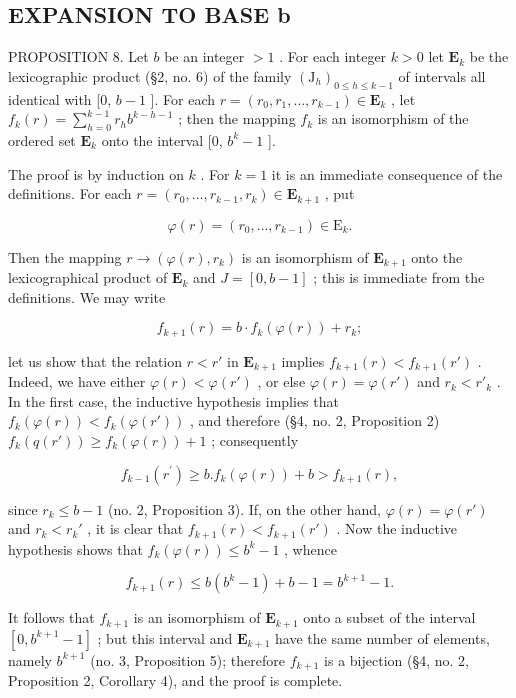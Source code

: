 \subsection{EXPANSION TO BASE b}

PROPOSITION 8. Let \(b\) be an integer \(> 1\) . For each integer \(k > 0\) let \(\mathbf{E}_k\) be the lexicographic product (§2, no. 6) of the family \((\mathrm{J}_h)_{0 \leqslant h \leqslant k-1}\) of intervals all identical with {[}0, \(b - 1\) {]}. For each \(r = (r_0, r_1, \ldots, r_{k-1}) \in \mathbf{E}_k\) , let \(f_k(r) = \sum_{h=0}^{k-1} r_h b^{k-h-1}\) ; then the mapping \(f_k\) is an isomorphism of the ordered set \(\mathbf{E}_k\) onto the interval {[}0, \(b^k - 1\) {]}.

The proof is by induction on \(k\) . For \(k = 1\) it is an immediate consequence of the definitions. For each \(r = (r_0, \ldots, r_{k-1}, r_k) \in \mathbf{E}_{k+1}\) , put

\[
\varphi (r) = \left(r _ {0}, \dots , r _ {k - 1}\right) \in \mathrm{E} _ {k}.
\]

Then the mapping \(r \to (\varphi(r), r_k)\) is an isomorphism of \(\mathbf{E}_{k+1}\) onto the lexicographical product of \(\mathbf{E}_k\) and \(J = [0, b - 1]\) ; this is immediate from the definitions. We may write

\[
f _ {k + 1} (r) = b \cdot f _ {k} (\varphi (r)) + r _ {k};
\]

let us show that the relation \(r < r'\) in \(\mathbf{E}_{k+1}\) implies \(f_{k+1}(r) < f_{k+1}(r')\) . Indeed, we have either \(\varphi(r) < \varphi(r')\) , or else \(\varphi(r) = \varphi(r')\) and \(r_k < r'_k\) . In the first case, the inductive hypothesis implies that \(f_k(\varphi(r)) < f_k(\varphi(r'))\) , and therefore (§4, no. 2, Proposition 2) \(f_k(q(r')) \geqslant f_k(\varphi(r)) + 1\) ; consequently

\[
f _ {k - 1} (r ^ {\prime}) \geqslant b. f _ {k} (\varphi (r)) + b > f _ {k + 1} (r),
\]

since \(r_k \leqslant b - 1\) (no. 2, Proposition 3). If, on the other hand, \(\varphi(r) = \varphi(r')\) and \(r_k < r_k'\) , it is clear that \(f_{k+1}(r) < f_{k+1}(r')\) . Now the inductive hypothesis shows that \(f_k(\varphi(r)) \leqslant b^k - 1\) , whence

\[
f _ {k + 1} (r) \leqslant b (b ^ {k} - 1) + b - 1 = b ^ {k + 1} - 1.
\]

It follows that \(f_{k+1}\) is an isomorphism of \(\mathbf{E}_{k+1}\) onto a subset of the interval \([0, b^{k+1} - 1]\) ; but this interval and \(\mathbf{E}_{k+1}\) have the same number of elements, namely \(b^{k+1}\) (no. 3, Proposition 5); therefore \(f_{k+1}\) is a bijection (§4, no. 2, Proposition 2, Corollary 4), and the proof is complete.

